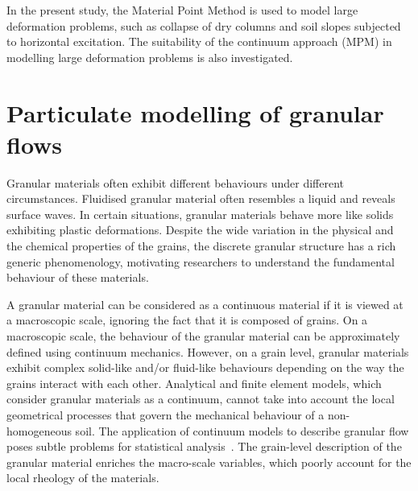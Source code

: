 In the present study, the Material Point Method is used to model large 
deformation problems, such as collapse of dry columns and soil slopes subjected 
to horizontal excitation. The suitability of the continuum approach (MPM) in 
modelling large deformation problems is also investigated.

\section{Particulate modelling of granular flows}

Granular materials often exhibit different behaviours under different 
circumstances. Fluidised granular material often resembles a liquid and 
reveals surface waves. In certain situations, granular materials behave more 
like solids exhibiting plastic deformations. Despite the wide variation in 
the physical and the chemical properties of the grains, the discrete granular 
structure has a rich generic phenomenology, motivating researchers to 
understand the fundamental behaviour of these materials. 

A granular material can be 
considered as a continuous material if it is viewed at a macroscopic scale, 
ignoring the fact that it is composed of grains. On a macroscopic scale, the 
behaviour of the granular material can be approximately defined using 
continuum mechanics. However, on a grain level, granular materials 
exhibit complex solid-like and/or fluid-like behaviours depending on the way 
the grains interact with each other. Analytical and finite element models, 
which consider granular materials as a continuum, cannot take into account the 
local geometrical processes that govern the mechanical behaviour of a 
non-homogeneous soil. The application of continuum models to describe granular 
flow poses subtle problems for statistical analysis~\citep{Mehta1994}. 
The grain-level description of the granular material enriches the macro-scale 
variables, which poorly account for the local rheology of the materials. 

